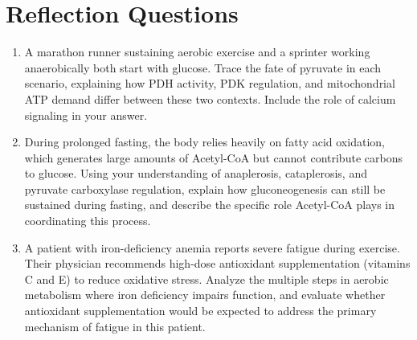 \documentclass{tufte-handout}
\begin{document}
\section{Reflection Questions}
\begin{enumerate}
\item A marathon runner sustaining aerobic exercise and a sprinter working anaerobically both start with glucose. Trace the fate of pyruvate in each scenario, explaining how PDH activity, PDK regulation, and mitochondrial ATP demand differ between these two contexts. Include the role of calcium signaling in your answer.
\item During prolonged fasting, the body relies heavily on fatty acid oxidation, which generates large amounts of Acetyl-CoA but cannot contribute carbons to glucose. Using your understanding of anaplerosis, cataplerosis, and pyruvate carboxylase regulation, explain how gluconeogenesis can still be sustained during fasting, and describe the specific role Acetyl-CoA plays in coordinating this process.
\item A patient with iron-deficiency anemia reports severe fatigue during exercise. Their physician recommends high-dose antioxidant supplementation (vitamins C and E) to reduce oxidative stress. Analyze the multiple steps in aerobic metabolism where iron deficiency impairs function, and evaluate whether antioxidant supplementation would be expected to address the primary mechanism of fatigue in this patient.
\end{enumerate}



\end{document}
